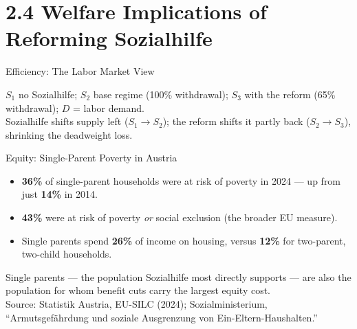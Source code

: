\documentclass[11pt,aspectratio=169]{beamer}
\newcommand{\srcnote}[1]{{\footnotesize\color{wugray}Source: #1}}
\begin{document}
\section{2.4 Welfare Implications of Reforming Sozialhilfe}

\begin{frame}{Efficiency: The Labor Market View}
  \begin{center}
  \end{center}
  \centering \small
  $S_1$ no Sozialhilfe; $S_2$ base regime (100\% withdrawal); $S_3$ with the reform (65\% withdrawal); $D$ = labor demand.\\
  Sozialhilfe shifts supply left ($S_1{\to}S_2$); the reform shifts it partly back ($S_2{\to}S_3$), shrinking the deadweight loss.
\end{frame}

\begin{frame}{Equity: Single-Parent Poverty in Austria}
  \begin{itemize}
    \item \textbf{36\%} of single-parent households were at risk of poverty in 2024 --- up from just \textbf{14\%} in 2014.
    \item \textbf{43\%} were at risk of poverty \emph{or} social exclusion (the broader EU measure).
    \item Single parents spend \textbf{26\%} of income on housing, versus \textbf{12\%} for two-parent, two-child households.
  \end{itemize}
  \vspace{0.5em}
  \centering \small
  Single parents --- the population Sozialhilfe most directly supports --- are also the population for whom benefit cuts carry the largest equity cost.\\
  \srcnote{Statistik Austria, EU-SILC (2024); Sozialministerium, ``Armutsgefährdung und soziale Ausgrenzung von Ein-Eltern-Haushalten.''}
\end{frame}
\end{document}
